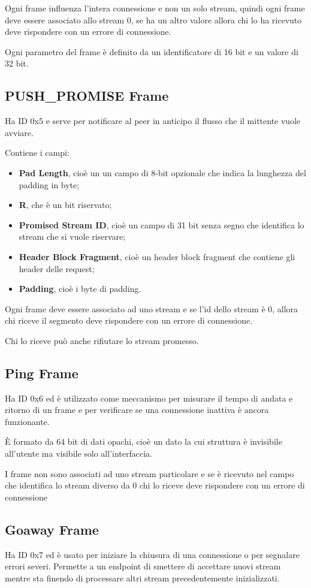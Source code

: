 \documentclass[12pt, a4paper]{article} %
\begin{document}
Ogni frame influenza l'intera connessione e non un solo stream, quindi ogni frame deve essere associato allo stream 0, se ha un altro valore allora chi lo ha ricevuto deve rispondere con un errore di connessione.

Ogni parametro del frame è definito da un identificatore di 16 bit e un valore di 32 bit.

\subsection{PUSH\_PROMISE Frame}
Ha ID 0x5 e serve per notificare al peer in anticipo il flusso che il mittente vuole avviare.

Contiene i campi:
\begin{itemize}
  \item \textbf{Pad Length}, cioè un un campo di 8-bit opzionale che indica la lunghezza del padding in byte;
  \item \textbf{R}, che è un bit riservato;
  \item \textbf{Promised Stream ID}, cioè un campo di 31 bit senza segno che identifica lo stream che si vuole riservare;
  \item \textbf{Header Block Fragment}, cioè un header block fragment che contiene gli header delle request;
  \item \textbf{Padding}, cioè i byte di padding.
\end{itemize}

Ogni frame deve essere associato ad uno stream e se l'id dello stream è 0, allora chi riceve il segmento deve rispondere con un errore di connessione.

Chi lo riceve può anche rifiutare lo stream promesso.

\subsection{Ping Frame}
Ha ID 0x6 ed è utilizzato come meccanismo per misurare il tempo di andata e ritorno di un frame e per verificare se una connessione inattiva è ancora funzionante.

\uppercase{è} formato da 64 bit di dati opachi, cioè un dato la cui struttura è invisibile all'utente ma visibile solo all'interfaccia.

I frame non sono associati ad uno stream particolare e se è ricevuto nel campo che identifica lo stream diverso da 0 chi lo riceve deve rispondere con un errore di connessione

\subsection{Goaway Frame}
Ha ID 0x7 ed è usato per iniziare la chiusura di una connessione o per segnalare errori severi. Permette a un endpoint di smettere di accettare nuovi stream mentre sta finendo di processare altri stream precedentemente inizializzati.
\end{document}
